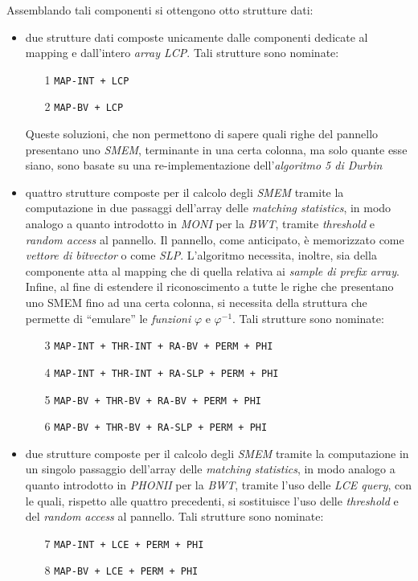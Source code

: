 Assemblando tali componenti si ottengono otto strutture dati:
\begin{itemize}
  \item due strutture dati composte unicamente dalle componenti dedicate al
  mapping e dall'intero \textit{array LCP}. Tali strutture sono nominate:
  \begin{enumerate}
    \item[1] \texttt{MAP-INT + LCP}
    \item[2] \texttt{MAP-BV + LCP}
  \end{enumerate}
  Queste soluzioni, che non permettono di sapere quali righe del pannello
  presentano uno \textit{SMEM}, terminante in una certa colonna, ma solo quante
  esse siano, sono basate su una re-implementazione dell'\textit{algoritmo 5 di
    Durbin}
  \item quattro strutture composte per il calcolo degli \textit{SMEM} tramite la
  computazione 
  in due passaggi dell'array delle \textit{matching statistics}, in modo analogo
  a quanto introdotto in \textit{MONI} per la \textit{BWT}, tramite
  \textit{threshold} e \textit{random access} al pannello. Il pannello, come
  anticipato, è memorizzato come \textit{vettore di bitvector} o come
  \textit{SLP}. L'algoritmo  
  necessita, inoltre, sia della componente atta al mapping che di quella
  relativa ai \textit{sample di prefix array}. Infine, al fine di estendere il
  riconoscimento a tutte le righe che presentano uno SMEM fino ad una certa
  colonna, si necessita della struttura che permette di ``emulare'' le
  \textit{funzioni} $\varphi$ e $\varphi^{-1}$. Tali strutture sono nominate:
  \begin{enumerate}
    \item[3] \texttt{MAP-INT + THR-INT + RA-BV + PERM + PHI}
    \item[4] \texttt{MAP-INT + THR-INT + RA-SLP + PERM + PHI}
    \item[5] \texttt{MAP-BV + THR-BV + RA-BV + PERM + PHI}
    \item[6] \texttt{MAP-BV + THR-BV + RA-SLP + PERM + PHI}
  \end{enumerate}
  \item due strutture composte per il calcolo degli \textit{SMEM} tramite la
  computazione 
  in un singolo passaggio dell'array delle \textit{matching statistics}, in modo
  analogo a quanto introdotto in \textit{PHONII} per la \textit{BWT}, tramite
  l'uso delle \textit{LCE query}, con le quali, rispetto alle quattro
  precedenti, si sostituisce l'uso delle \textit{threshold} e del \textit{random
    access} al pannello. Tali strutture sono nominate:
  \begin{enumerate}
    \item[7] \texttt{MAP-INT + LCE + PERM + PHI}
    \item[8] \texttt{MAP-BV + LCE + PERM + PHI}
  \end{enumerate}
\end{itemize}
